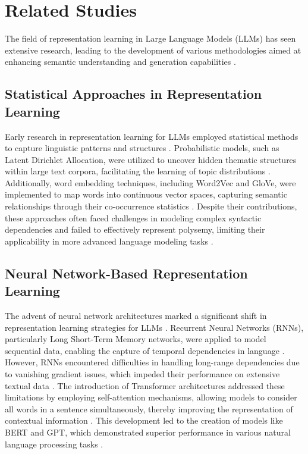 \section{Related Studies}
The field of representation learning in Large Language Models (LLMs) has seen extensive research, leading to the development of various methodologies aimed at enhancing semantic understanding and generation capabilities \cite{wang2024optimizing,kanax2024contextualized}.

\subsection{Statistical Approaches in Representation Learning}

Early research in representation learning for LLMs employed statistical methods to capture linguistic patterns and structures \cite{amizern2024dynamic}. Probabilistic models, such as Latent Dirichlet Allocation, were utilized to uncover hidden thematic structures within large text corpora, facilitating the learning of topic distributions \cite{golatkar2024cpr}. Additionally, word embedding techniques, including Word2Vec and GloVe, were implemented to map words into continuous vector spaces, capturing semantic relationships through their co-occurrence statistics \cite{bargamon2024hierarchical,underwood2024implementing}. Despite their contributions, these approaches often faced challenges in modeling complex syntactic dependencies and failed to effectively represent polysemy, limiting their applicability in more advanced language modeling tasks \cite{cunningham2024efficient}.

\subsection{Neural Network-Based Representation Learning}

The advent of neural network architectures marked a significant shift in representation learning strategies for LLMs \cite{wong2024efficiency}. Recurrent Neural Networks (RNNs), particularly Long Short-Term Memory networks, were applied to model sequential data, enabling the capture of temporal dependencies in language \cite{fairburn2024mitigate,farmer2024optimizing}. However, RNNs encountered difficulties in handling long-range dependencies due to vanishing gradient issues, which impeded their performance on extensive textual data \cite{welling2024semantic}. The introduction of Transformer architectures addressed these limitations by employing self-attention mechanisms, allowing models to consider all words in a sentence simultaneously, thereby improving the representation of contextual information \cite{hubsch2024articulating, embury2024dynamic}. This development led to the creation of models like BERT and GPT, which demonstrated superior performance in various natural language processing tasks \cite{chen2024dynamic}.

